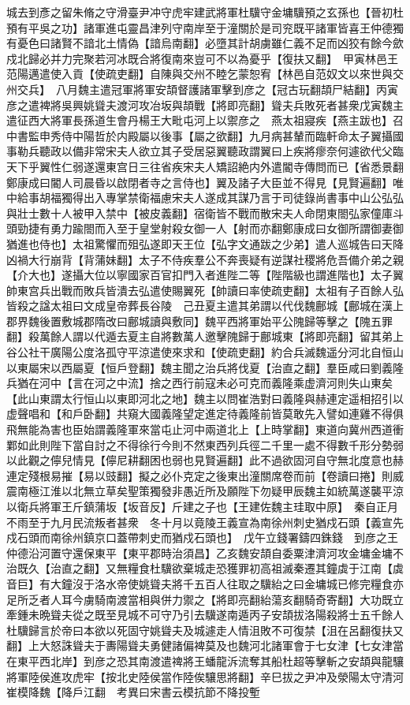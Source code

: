 城去到彥之留朱脩之守滑臺尹冲守虎牢建武將軍杜驥守金墉驥預之玄孫也【晉初杜預有平吳之功】諸軍進屯靈昌津列守南岸至于潼關於是司兖既平諸軍皆喜王仲德獨有憂色曰諸賢不諳北土情偽【諳烏南翻】必墮其計胡虜雖仁義不足而凶狡有餘今歛戍北歸必并力完聚若河冰既合將復南來豈可不以為憂乎【復扶又翻】　甲寅林邑王范陽邁遣使入貢【使疏吏翻】自陳與交州不睦乞蒙恕宥【林邑自范奴文以來世與交州交兵】　八月魏主遣冠軍將軍安頡督護諸軍擊到彦之【冠古玩翻頡尸結翻】丙寅彦之遣裨將吳興姚聳夫渡河攻冶坂與頡戰【將即亮翻】聳夫兵敗死者甚衆戊寅魏主遣征西大將軍長孫道生會丹楊王大毗屯河上以禦彦之　燕太祖寢疾【燕主跋也】召中書監申秀侍中陽哲於内殿屬以後事【屬之欲翻】九月病甚輦而臨軒命太子翼攝國事勒兵聽政以備非常宋夫人欲立其子受居惡翼聽政謂翼曰上疾將瘳奈何遽欲代父臨天下乎翼性仁弱遂還東宫日三往省疾宋夫人矯詔絶内外遣閽寺傳問而已【省悉景翻鄭康成曰閽人司晨昏以啟閉者寺之言侍也】翼及諸子大臣並不得見【見賢遍翻】唯中給事胡福獨得出入專掌禁衛福慮宋夫人遂成其謀乃言于司徒錄尚書事中山公弘弘與壯士數十人被甲入禁中【被皮義翻】宿衛皆不戰而散宋夫人命閉東閤弘家僮庫斗頭勁捷有勇力踰閤而入至于皇堂射殺女御一人【射而亦翻鄭康成曰女御所謂御妻御猶進也侍也】太祖驚懼而殂弘遂即天王位【弘字文通跋之少弟】遣人巡城告曰天降凶禍大行崩背【背蒲妹翻】太子不侍疾羣公不奔喪疑有逆謀社稷將危吾備介弟之親【介大也】遂攝大位以寧國家百官扣門入者進陛二等【陛階級也謂進階也】太子翼帥東宫兵出戰而敗兵皆潰去弘遣使賜翼死【帥讀曰率使疏吏翻】太祖有子百餘人弘皆殺之諡太祖曰文成皇帝葬長谷陵　己丑夏主遣其弟謂以代伐魏鄜城【鄜城在漢上郡界魏後置敷城郡隋改曰鄜城讀與敷同】魏平西將軍始平公隗歸等擊之【隗五罪翻】殺萬餘人謂以代遁去夏主自將數萬人邀擊隗歸于鄜城東【將即亮翻】留其弟上谷公社干廣陽公度洛孤守平涼遣使來求和【使疏吏翻】約合兵滅魏遥分河北自恒山以東屬宋以西屬夏【恒戶登翻】魏主聞之治兵將伐夏【治直之翻】羣臣咸曰劉義隆兵猶在河中【言在河之中流】捨之西行前寇未必可克而義隆乘虚濟河則失山東矣【此山東謂太行恒山以東即河北之地】魏主以問崔浩對曰義隆與赫連定遥相招引以虚聲唱和【和戶卧翻】共窺大國義隆望定進定待義隆前皆莫敢先入譬如連雞不得俱飛無能為害也臣始謂義隆軍來當屯止河中兩道北上【上時掌翻】東道向冀州西道衝鄴如此則陛下當自討之不得徐行今則不然東西列兵徑二千里一處不得數千形分勢弱以此觀之儜兒情見【儜尼耕翻困也弱也見賢遍翻】此不過欲固河自守無北度意也赫連定殘根易摧【易以豉翻】擬之必仆克定之後東出潼關席卷而前【卷讀曰捲】則威震南極江淮以北無立草矣聖策獨發非愚近所及願陛下勿疑甲辰魏主如統萬遂襲平涼以衛兵將軍王斤鎮蒲坂【坂音反】斤建之子也【王建佐魏主珪取中原】　秦自正月不雨至于九月民流叛者甚衆　冬十月以竟陵王義宣為南徐州刺史猶戍石頭【義宣先戍石頭而南徐州鎮京口蓋帶刺史而猶戍石頭也】　戊午立錢署鑄四銖錢　到彦之王仲德沿河置守還保東平【東平郡時治須昌】乙亥魏安頡自委粟津濟河攻金墉金墉不治既久【治直之翻】又無糧食杜驥欲棄城走恐獲罪初高祖滅秦遷其鐘虡于江南【虡音巨】有大鐘沒于洛水帝使姚聳夫將千五百人往取之驥紿之曰金墉城已修完糧食亦足所乏者人耳今虜騎南渡當相與併力禦之【將即亮翻紿蕩亥翻騎奇寄翻】大功既立牽鍾未晩聳夫從之既至見城不可守乃引去驥遂南遁丙子安頡拔洛陽殺將士五千餘人杜驥歸言於帝曰本欲以死固守姚聳夫及城遽走人情沮敗不可復禁【沮在呂翻復扶又翻】上大怒誅聳夫于夀陽聳夫勇健諸偏裨莫及也魏河北諸軍會于七女津【七女津當在東平西北岸】到彦之恐其南渡遣禆將王蟠龍泝流奪其船杜超等擊斬之安頡與龍驤將軍陸侯進攻虎牢【按北史陸侯當作陸俟驤思將翻】辛巳拔之尹冲及滎陽太守清河崔模降魏【降戶江翻　考異曰宋書云模抗節不降投塹